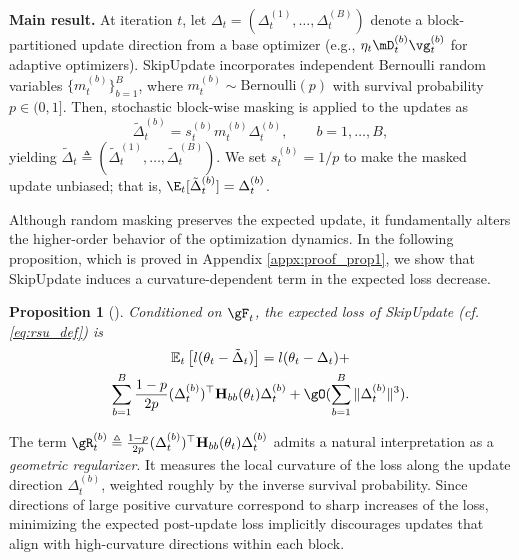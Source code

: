 \documentclass[11pt, a4paper, twocolumn, copyright, goog]{google}
\theoremstyle{plain}
\newtheorem{proposition}[theorem]{Proposition}
\theoremstyle{definition}
\theoremstyle{remark}
\begin{document}
\textbf{Main result.}
At iteration $t$, let $\Delta_t = (\Delta_t^{(1)},\ldots,\Delta_t^{(B)})$ denote a block-partitioned update direction from a base optimizer (e.g., $\eta_t \mD_t^{(b)} \vg_t^{(b)}$ for adaptive optimizers). 
SkipUpdate incorporates independent Bernoulli random variables $\{m_{t}^{(b)}\}_{b=1}^B$, where $m_{t}^{(b)} \sim \mathrm{Bernoulli}(p)$ with survival probability $p \in (0,1]$.
Then, stochastic block-wise masking is applied to the updates as 
\begin{equation} \label{eq:rsu_def}
    \tilde{\Delta}_t^{(b)} =  s_t^{(b)} m_{t}^{(b)}\Delta_t^{(b)} , 
\qquad b = 1,\ldots,B,
\end{equation}
yielding $\tilde{\Delta}_t \triangleq (\tilde{\Delta}_t^{(1)},\ldots,\tilde{\Delta}_t^{(B)})$. We set $s_t^{(b)} = 1/ p$ to make the masked update unbiased; that is, $\E_t [ \tilde{\Delta}_t^{(b)} ] = \Delta_t^{(b)}$.



Although random masking preserves the expected update, it fundamentally alters the higher-order behavior of the optimization dynamics.
In the following proposition, which is proved in Appendix \ref{appx:proof_prop1}, we show that SkipUpdate induces a curvature-dependent term in the expected loss decrease.

\begin{proposition}[] \label{lemma:implicit_reg}
Conditioned on $\gF_t$, the expected loss of SkipUpdate (cf. \eqref{eq:rsu_def}) is 
\begin{multline} \label{eq:implicit_reg}
    \mathbb{E}_t\left[l(\theta_t-\tilde{\Delta}_t) \right] = l(\theta_t-\Delta_t) + \\
    \sum_{b=1}^B \frac{1-p}{2p} (\Delta_t^{(b)})^\top  \mathbf{H}_{bb}(\theta_t) \Delta_t^{(b)}
    + \gO(\sum_{b=1}^B \|\Delta_t^{(b)}\|^3).
\end{multline}
\end{proposition}


The term $\gR_t^{(b)} \triangleq \frac{1-p}{2p} (\Delta_t^{(b)})^\top \mathbf{H}_{bb}(\theta_t) \Delta_t^{(b)}$ admits a natural interpretation as a \emph{geometric regularizer}. 
It measures the local curvature of the loss along the update direction $\Delta_t^{(b)}$, weighted roughly by the inverse survival probability. 
Since directions of large positive curvature correspond to sharp increases of the loss, minimizing the expected post-update loss implicitly discourages updates that align with high-curvature directions within each block. 
\end{document}
